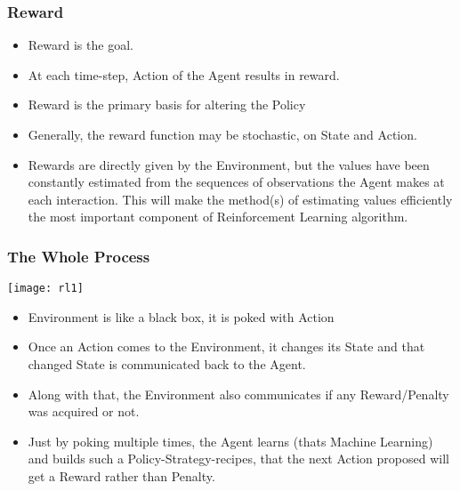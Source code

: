 \begin{frame}[fragile]\frametitle{Reward}

\begin{itemize}
\item Reward is the goal.
\item At each time-step, Action of the Agent results in reward.
\item Reward is the primary basis for altering the Policy
\item Generally, the reward function may be stochastic, on State and Action.
\item Rewards are directly given by the Environment, but the values have been constantly estimated from the sequences of observations the Agent makes at each interaction. This will make the method(s) of estimating values efficiently the most important component of Reinforcement Learning algorithm.
\end{itemize}

\end{frame}






\begin{frame}[fragile]\frametitle{The Whole Process}

\begin{center}
\texttt{[image: rl1]}
\end{center}

\begin{itemize}
\item Environment is like a black box, it is poked with Action
\item Once an Action comes to the Environment, it changes its State and that changed State is communicated back to the Agent.
\item Along with that, the Environment also communicates if any Reward/Penalty was acquired or not.
\item Just by poking multiple times, the Agent learns (thats Machine Learning) and builds such a Policy-Strategy-recipes, that the next Action proposed will get a Reward rather than Penalty.
\end{itemize}
\end{frame}



